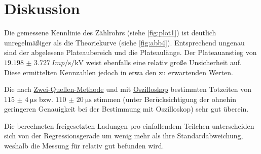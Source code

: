 \section{Diskussion} \label{sec:Diskussion}

Die gemessene Kennlinie des Zählrohrs (siehe \autoref{fig:plot1}) ist deutlich unregelmäßiger als die Theoriekurve (siehe \autoref{fig:abb4}).
Entsprechend ungenau sind der abgelesene Plateaubereich und die Plateaulänge.
Der Plateauanstieg von $\SI{19.198(3727)}{{Imp}\per\second\per\kilo\volt}$ weist ebenfalls eine relativ große Unsicherheit auf.
Diese ermittelten Kennzahlen jedoch in etwa den zu erwartenden Werten.


Die nach \hyperref[sec:totzeit_zweiquellen]{Zwei-Quellen-Methode} und mit \hyperref[sec:totzeit_zweiquellen]{Oszilloskop} bestimmten Totzeiten
von $\SI{115(4)}{\micro\second}$ bzw. $\SI{110(20)}{\micro\second}$
stimmen (unter Berücksichtigung der ohnehin geringeren Genauigkeit bei der Bestimmung mit Oszilloskop)
sehr gut überein.


Die berechneten freigesetzten Ladungen pro einfallendem Teilchen
unterscheiden sich von der Regressionsgerade um wenig mehr als ihre Standardabweichung,
weshalb die Messung für relativ gut befunden wird.
